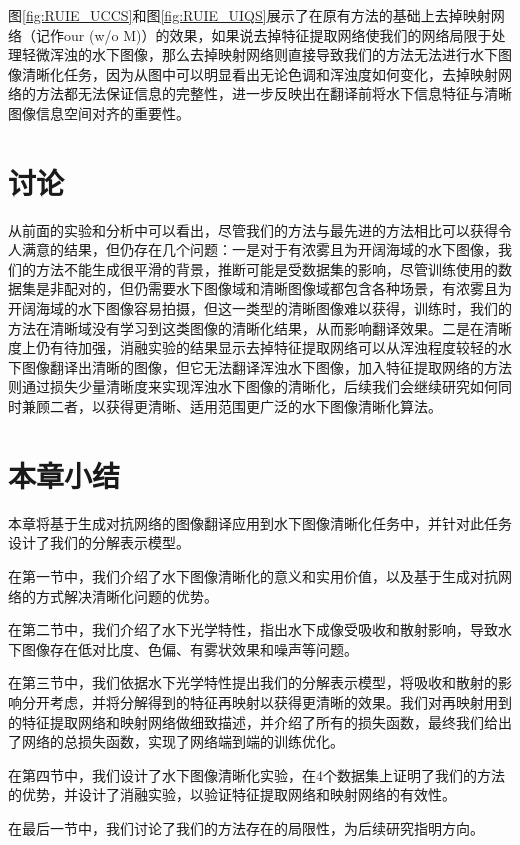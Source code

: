 图\ref{fig:RUIE_UCCS}和图\ref{fig:RUIE_UIQS}展示了在原有方法的基础上去掉映射网络（记作our (w/o M)）的效果，如果说去掉特征提取网络使我们的网络局限于处理轻微浑浊的水下图像，那么去掉映射网络则直接导致我们的方法无法进行水下图像清晰化任务，因为从图中可以明显看出无论色调和浑浊度如何变化，去掉映射网络的方法都无法保证信息的完整性，进一步反映出在翻译前将水下信息特征与清晰图像信息空间对齐的重要性。

\section{讨论}

从前面的实验和分析中可以看出，尽管我们的方法与最先进的方法相比可以获得令人满意的结果，但仍存在几个问题：一是对于有浓雾且为开阔海域的水下图像，我们的方法不能生成很平滑的背景，推断可能是受数据集的影响，尽管训练使用的数据集是非配对的，但仍需要水下图像域和清晰图像域都包含各种场景，有浓雾且为开阔海域的水下图像容易拍摄，但这一类型的清晰图像难以获得，训练时，我们的方法在清晰域没有学习到这类图像的清晰化结果，从而影响翻译效果。二是在清晰度上仍有待加强，消融实验的结果显示去掉特征提取网络可以从浑浊程度较轻的水下图像翻译出清晰的图像，但它无法翻译浑浊水下图像，加入特征提取网络的方法则通过损失少量清晰度来实现浑浊水下图像的清晰化，后续我们会继续研究如何同时兼顾二者，以获得更清晰、适用范围更广泛的水下图像清晰化算法。

\section{本章小结}

本章将基于生成对抗网络的图像翻译应用到水下图像清晰化任务中，并针对此任务设计了我们的分解表示模型。

在第一节中，我们介绍了水下图像清晰化的意义和实用价值，以及基于生成对抗网络的方式解决清晰化问题的优势。

在第二节中，我们介绍了水下光学特性，指出水下成像受吸收和散射影响，导致水下图像存在低对比度、色偏、有雾状效果和噪声等问题。

在第三节中，我们依据水下光学特性提出我们的分解表示模型，将吸收和散射的影响分开考虑，并将分解得到的特征再映射以获得更清晰的效果。我们对再映射用到的特征提取网络和映射网络做细致描述，并介绍了所有的损失函数，最终我们给出了网络的总损失函数，实现了网络端到端的训练优化。

在第四节中，我们设计了水下图像清晰化实验，在4个数据集上证明了我们的方法的优势，并设计了消融实验，以验证特征提取网络和映射网络的有效性。

在最后一节中，我们讨论了我们的方法存在的局限性，为后续研究指明方向。




